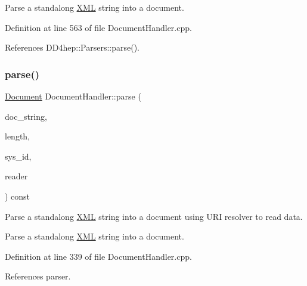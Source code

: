 Parse a standalong \hyperlink{namespace_d_d4hep_1_1_x_m_l}{X\+ML} string into a document. 



Definition at line 563 of file Document\+Handler.\+cpp.



References D\+D4hep\+::\+Parsers\+::parse().

\hypertarget{class_d_d4hep_1_1_x_m_l_1_1_document_handler_a4481bbfb8c78aaeb47d538eb07eb32d9}{}\label{class_d_d4hep_1_1_x_m_l_1_1_document_handler_a4481bbfb8c78aaeb47d538eb07eb32d9} 
\subsubsection{\texorpdfstring{parse()}{parse()}\hspace{0.1cm}{\footnotesize\ttfamily [2/2]}}
{\footnotesize\ttfamily \hyperlink{class_d_d4hep_1_1_x_m_l_1_1_document}{Document} Document\+Handler\+::parse (\begin{DoxyParamCaption}\item[{const char $\ast$}]{doc\+\_\+string,  }\item[{size\+\_\+t}]{length,  }\item[{const char $\ast$}]{sys\+\_\+id,  }\item[{\hyperlink{class_d_d4hep_1_1_x_m_l_1_1_uri_reader}{Uri\+Reader} $\ast$}]{reader }\end{DoxyParamCaption}) const\hspace{0.3cm}{\ttfamily [virtual]}}



Parse a standalong \hyperlink{namespace_d_d4hep_1_1_x_m_l}{X\+ML} string into a document using U\+RI resolver to read data. 

Parse a standalong \hyperlink{namespace_d_d4hep_1_1_x_m_l}{X\+ML} string into a document. 

Definition at line 339 of file Document\+Handler.\+cpp.



References parser.

\hypertarget{class_d_d4hep_1_1_x_m_l_1_1_document_handler_aac81a43d656b9c4149d6e40642abf0fb}{}\label{class_d_d4hep_1_1_x_m_l_1_1_document_handler_aac81a43d656b9c4149d6e40642abf0fb} 
